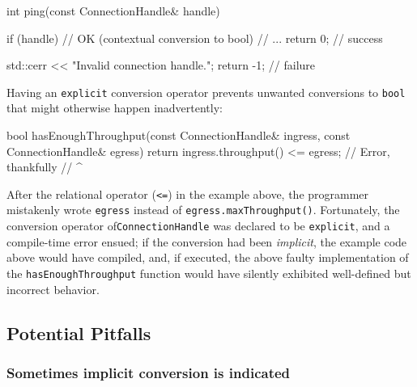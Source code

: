 \begin{emcppslisting}[emcppsbatch=e2]
int ping(const ConnectionHandle& handle)
{
    if (handle)  // OK (contextual conversion to bool)
    {
        // ...
        return 0;  // success
    }

    std::cerr << "Invalid connection handle.\n";
    return -1;  // failure
}
\end{emcppslisting}
    
\noindent Having an \lstinline!explicit! conversion operator prevents unwanted
conversions to \lstinline!bool! that might otherwise happen inadvertently:

\begin{emcppslisting}[emcppsbatch=e2]
bool hasEnoughThroughput(const ConnectionHandle& ingress,
                         const ConnectionHandle& egress)
{
    return ingress.throughput() <= egress;  // Error, thankfully
//                                    ^~~~~~
}
\end{emcppslisting}
    
\noindent After the relational operator (\lstinline!<=!) in the example above, the
programmer mistakenly wrote \lstinline!egress! instead of
\mbox{\lstinline!egress.maxThroughput()!}. Fortunately, the conversion operator of\linebreak[4] %
\mbox{\lstinline!ConnectionHandle!} was declared to be \lstinline!explicit!, and a
compile-time error ensued; if the conversion had
been \emph{implicit}, the example code above would have compiled, and,
if executed, the above faulty implementation of the \mbox{\lstinline!hasEnoughThroughput!}
function would have silently exhibited well-defined but incorrect
behavior.

\subsection[Potential Pitfalls]{Potential Pitfalls}\label{potential-pitfalls-explicitconv}

\subsubsection[Sometimes implicit conversion \emph{is} indicated]{Sometimes implicit conversion {\sfbsubsubsecitalRomeo is} indicated}\label{sometimes-implicit-conversion-is-indicated}

